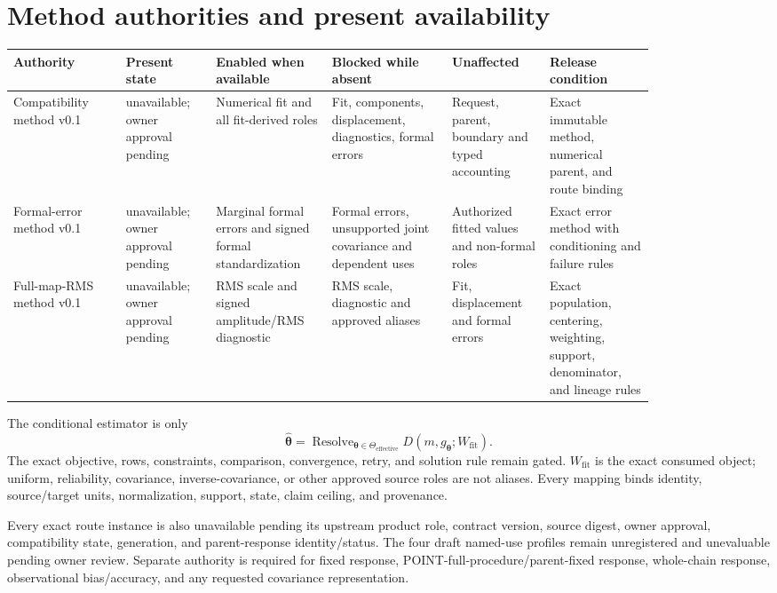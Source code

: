 \documentclass[12pt]{article}
\newcommand{\thetahat}{\widehat{\boldsymbol{\theta}}}
\begin{document}
\section{Method authorities and present availability}

{\small
\begin{longtable}{@{}P{0.15\linewidth}P{0.12\linewidth}P{0.14\linewidth}P{0.16\linewidth}P{0.13\linewidth}P{0.14\linewidth}@{}}
\toprule
Authority & Present state & Enabled when available & Blocked while absent & Unaffected & Release condition \\
\midrule
\endhead
Compatibility method v0.1 & unavailable; owner approval pending & Numerical fit and all fit-derived roles & Fit, components, displacement, diagnostics, formal errors & Request, parent, boundary and typed accounting & Exact immutable method, numerical parent, and route binding \\
Formal-error method v0.1 & unavailable; owner approval pending & Marginal formal errors and signed formal standardization & Formal errors, unsupported joint covariance and dependent uses & Authorized fitted values and non-formal roles & Exact error method with conditioning and failure rules \\
Full-map-RMS method v0.1 & unavailable; owner approval pending & RMS scale and signed amplitude/RMS diagnostic & RMS scale, diagnostic and approved aliases & Fit, displacement and formal errors & Exact population, centering, weighting, support, denominator, and lineage rules \\
\bottomrule
\end{longtable}
}

The conditional estimator is only
\begin{equation}
\thetahat=\operatorname{Resolve}_{\boldsymbol{\theta}\in\Theta_{\mathrm{effective}}}
D\!\left(m,g_{\boldsymbol{\theta}};W_{\mathrm{fit}}\right).
\end{equation}
The exact objective, rows, constraints, comparison, convergence, retry, and
solution rule remain gated. $W_{\mathrm{fit}}$ is the exact consumed object;
uniform, reliability, covariance, inverse-covariance, or other approved source
roles are not aliases. Every mapping binds identity, source/target units,
normalization, support, state, claim ceiling, and provenance.

Every exact route instance is also unavailable pending its upstream product
role, contract version, source digest, owner approval, compatibility state,
generation, and parent-response identity/status. The four draft named-use
profiles remain unregistered and unevaluable pending owner review. Separate
authority is required for fixed response, POINT-full-procedure/parent-fixed
response, whole-chain response, observational bias/accuracy, and any requested
covariance representation.
\end{document}

